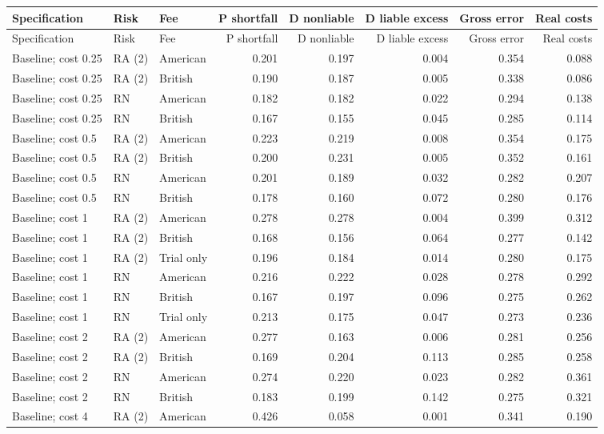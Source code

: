 \documentclass[10pt]{article}
\begin{document}
\small\setlength{\tabcolsep}{4pt}\begin{longtable}{@{}p{3.0in}llrrrrr@{}}
\toprule Specification & Risk & Fee & P shortfall & D nonliable & D liable excess & Gross error & Real costs\\\midrule\endfirsthead
\toprule Specification & Risk & Fee & P shortfall & D nonliable & D liable excess & Gross error & Real costs\\\midrule\endhead\bottomrule\endfoot
Baseline; cost 0.25 & RA (2) & American & 0.201 & 0.197 & 0.004 & 0.354 & 0.088\\
Baseline; cost 0.25 & RA (2) & British & 0.190 & 0.187 & 0.005 & 0.338 & 0.086\\
Baseline; cost 0.25 & RN & American & 0.182 & 0.182 & 0.022 & 0.294 & 0.138\\
Baseline; cost 0.25 & RN & British & 0.167 & 0.155 & 0.045 & 0.285 & 0.114\\
Baseline; cost 0.5 & RA (2) & American & 0.223 & 0.219 & 0.008 & 0.354 & 0.175\\
Baseline; cost 0.5 & RA (2) & British & 0.200 & 0.231 & 0.005 & 0.352 & 0.161\\
Baseline; cost 0.5 & RN & American & 0.201 & 0.189 & 0.032 & 0.282 & 0.207\\
Baseline; cost 0.5 & RN & British & 0.178 & 0.160 & 0.072 & 0.280 & 0.176\\
Baseline; cost 1 & RA (2) & American & 0.278 & 0.278 & 0.004 & 0.399 & 0.312\\
Baseline; cost 1 & RA (2) & British & 0.168 & 0.156 & 0.064 & 0.277 & 0.142\\
Baseline; cost 1 & RA (2) & Trial only & 0.196 & 0.184 & 0.014 & 0.280 & 0.175\\
Baseline; cost 1 & RN & American & 0.216 & 0.222 & 0.028 & 0.278 & 0.292\\
Baseline; cost 1 & RN & British & 0.167 & 0.197 & 0.096 & 0.275 & 0.262\\
Baseline; cost 1 & RN & Trial only & 0.213 & 0.175 & 0.047 & 0.273 & 0.236\\
Baseline; cost 2 & RA (2) & American & 0.277 & 0.163 & 0.006 & 0.281 & 0.256\\
Baseline; cost 2 & RA (2) & British & 0.169 & 0.204 & 0.113 & 0.285 & 0.258\\
Baseline; cost 2 & RN & American & 0.274 & 0.220 & 0.023 & 0.282 & 0.361\\
Baseline; cost 2 & RN & British & 0.183 & 0.199 & 0.142 & 0.275 & 0.321\\
Baseline; cost 4 & RA (2) & American & 0.426 & 0.058 & 0.001 & 0.341 & 0.190\\

\end{longtable}
\end{document}
